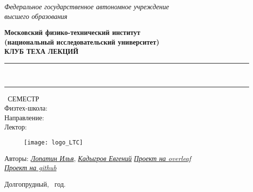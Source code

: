 \begin{titlepage}
	\clearpage\thispagestyle{empty}
	\centering
	
	\textit{Федеральное государственное автономное учреждение \\
		высшего образования}
	\vspace{0.5ex}
	
	\textbf{Московский физико-технический институт
    \\
    (национальный исследовательский университет)
    \\
     КЛУБ ТЕХА ЛЕКЦИЙ}
	\vspace{20ex}
	
	\rule{\linewidth}{0.5mm}
	{\textbf{\FullCourseNameFirstPart}}
	\\
	{\textbf{\FullCourseNameSecondPart}}
	\rule{\linewidth}{0.5mm}
	
	\SemesterNumber\ СЕМЕСТР
	\\
	Физтех-школа: \textit{\SchoolName}
	\\
	Направление: \textit{\TrackName}
	\\
	Лектор: \textit{\LecturerInitials}
	\vspace{1ex}
	
	\begin{figure}[!ht]
		\centering
		\texttt{[image: logo\_LTC]}
		\label{fig:my_label}
	\end{figure}
\begin{flushright}
	\noindent
	Авторы: \href{https://vk.com/ilia.lopatin}{ \textit{Лопатин Илья}},
	\href{https://vk.com/id95939286}{ \textit{Кадыгров Евгений}}
	\href{\OverleafLink}{\textit{Проект на overleaf}}
	\\
	\href{\GithubLink}{\textit{Проект на github}} 
\end{flushright}
	
	\vfill
	Долгопрудный, \CourseDate\ год.
	\pagebreak
	
\end{titlepage}